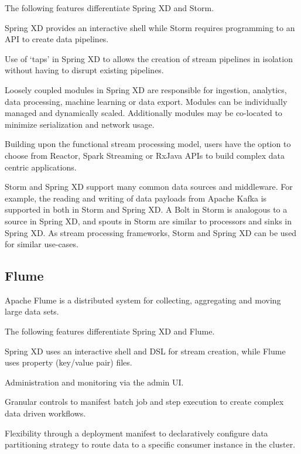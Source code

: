 The following features differentiate Spring XD and Storm.

\begin{itemize*}
\item Spring XD provides an interactive shell while Storm requires programming
to an API to create data pipelines.
\item Use of `taps' in Spring XD to allows the creation of stream pipelines
in isolation without having to disrupt existing pipelines.
\item Loosely coupled modules in Spring XD are responsible for ingestion, analytics,
data processing, machine learning or data export. Modules can be individually managed
and dynamically scaled. Additionally modules may be co-located to minimize
serialization and network usage.
\item Building upon the functional stream processing model, users have the option
to choose from Reactor\cite{reactor}, Spark Streaming or RxJava APIs to build
complex data centric applications.
\end{itemize*}

Storm and Spring XD support many common data sources and middleware.
For example, the reading and writing of data payloads from Apache Kafka
is supported in both in Storm and Spring XD. A Bolt in Storm is analogous to a
source in Spring XD, and spouts in Storm are similar to processors and sinks
in Spring XD. As stream processing frameworks, Storm and Spring XD can be used for
similar use-cases.

\subsection{Flume}
Apache Flume\cite{flume} is a distributed system for collecting, aggregating and 
moving large data sets.

The following features differentiate Spring XD and Flume.

\begin{itemize*}
\item Spring XD uses an interactive shell and DSL for stream creation,
while Flume uses property (key/value pair) files.
\item Administration and monitoring via the admin UI.
\item Granular controls to manifest batch job and step execution to create
complex data driven workflows.
\item Flexibility through a deployment manifest to declaratively configure data
partitioning strategy to route data to a specific consumer instance in the cluster.
\end{itemize*}

